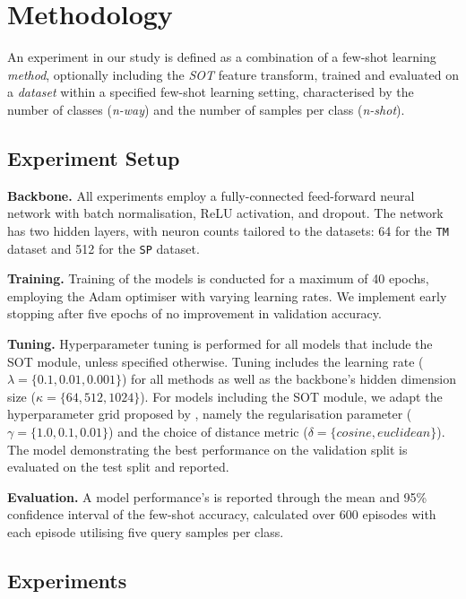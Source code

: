 \section{Methodology}

An experiment in our study is defined as a combination of a few-shot learning \textit{method}, optionally including the \textit{SOT} feature transform, trained and evaluated on a \textit{dataset} within 
a specified few-shot learning setting, characterised by the number of classes (\textit{n-way}) and the number of samples per class (\textit{n-shot}).

\subsection{Experiment Setup}

\textbf{Backbone.} All experiments employ a fully-connected feed-forward neural network with batch normalisation, ReLU activation, and dropout. 
The network has two hidden layers, with neuron counts tailored to the datasets: 64 for the \texttt{TM} dataset and 512 for the \texttt{SP} dataset.

\textbf{Training.} Training of the models is conducted for a maximum of 40 epochs, employing the Adam optimiser with varying learning rates. 
We implement early stopping after five epochs of no improvement in validation accuracy. 

\textbf{Tuning.} Hyperparameter tuning is performed for all models that include the SOT module, unless specified otherwise. Tuning includes the learning rate ($\lambda = \{0.1, 0.01, 0.001\}$) for all methods as well as the backbone's hidden dimension size ($\kappa = \{64, 512, 1024\}$). For models including the SOT module, we adapt the hyperparameter grid proposed by \citeauthor{sot}, namely the regularisation parameter ($\gamma = \{1.0, 0.1, 0.01\}$) and the choice of distance metric ($\delta = \{cosine, euclidean\}$). 
The model demonstrating the best performance on the validation split is evaluated on the test split and reported.

\textbf{Evaluation.} A model performance's is reported through the mean and 95\% confidence interval of the few-shot accuracy, calculated over 600 episodes with each episode utilising five query samples per class.

\subsection{Experiments}


